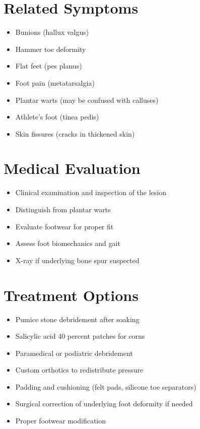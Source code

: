 \section*{Related Symptoms}
\begin{itemize}
\item Bunions (hallux valgus)
\item Hammer toe deformity
\item Flat feet (pes planus)
\item Foot pain (metatarsalgia)
\item Plantar warts (may be confused with calluses)
\item Athlete's foot (tinea pedis)
\item Skin fissures (cracks in thickened skin)
\end{itemize}

\section*{Medical Evaluation}
\begin{itemize}
\item Clinical examination and inspection of the lesion
\item Distinguish from plantar warts
\item Evaluate footwear for proper fit
\item Assess foot biomechanics and gait
\item X-ray if underlying bone spur suspected
\end{itemize}

\section*{Treatment Options}
\begin{itemize}
\item Pumice stone debridement after soaking
\item Salicylic acid 40 percent patches for corns
\item Paramedical or podiatric debridement
\item Custom orthotics to redistribute pressure
\item Padding and cushioning (felt pads, silicone toe separators)
\item Surgical correction of underlying foot deformity if needed
\item Proper footwear modification
\end{itemize}
